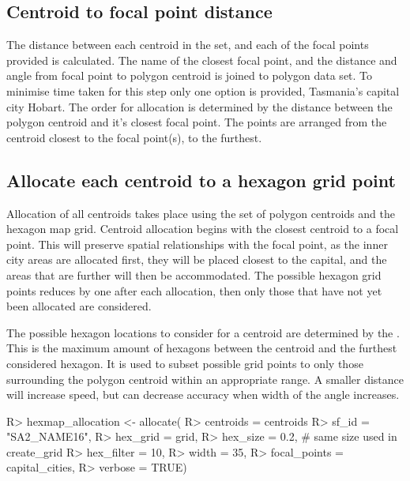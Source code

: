 \documentclass[
]{jss}
\begin{document}
\hypertarget{centroid-to-focal-point-distance}{%
\subsection{Centroid to focal point
distance}\label{centroid-to-focal-point-distance}}

The distance between each centroid in the set, and each of the focal
points provided is calculated. The name of the closest focal point, and
the distance and angle from focal point to polygon centroid is joined to
polygon data set. To minimise time taken for this step only one option
is provided, Tasmania's capital city Hobart. The order for allocation is
determined by the distance between the polygon centroid and it's closest
focal point. The points are arranged from the centroid closest to the
focal point(s), to the furthest.

\hypertarget{allocate-each-centroid-to-a-hexagon-grid-point}{%
\subsection{Allocate each centroid to a hexagon grid
point}\label{allocate-each-centroid-to-a-hexagon-grid-point}}

Allocation of all centroids takes place using the set of polygon
centroids and the hexagon map grid. Centroid allocation begins with the
closest centroid to a focal point. This will preserve spatial
relationships with the focal point, as the inner city areas are
allocated first, they will be placed closest to the capital, and the
areas that are further will then be accommodated. The possible hexagon
grid points reduces by one after each allocation, then only those that
have not yet been allocated are considered.

The possible hexagon locations to consider for a centroid are determined
by the . This is the maximum amount of hexagons between
the centroid and the furthest considered hexagon. It is used to subset
possible grid points to only those surrounding the polygon centroid
within an appropriate range. A smaller distance will increase speed, but
can decrease accuracy when width of the angle increases.

\begin{CodeChunk}

\begin{CodeInput}
R> hexmap_allocation <- allocate(
R>   centroids = centroids %
R>   sf_id = "SA2_NAME16",
R>   hex_grid = grid,
R>   hex_size = 0.2, # same size used in create_grid
R>   hex_filter = 10,
R>   width = 35,
R>   focal_points = capital_cities,
R>   verbose = TRUE)
\end{CodeInput}
\end{CodeChunk}
\end{document}
